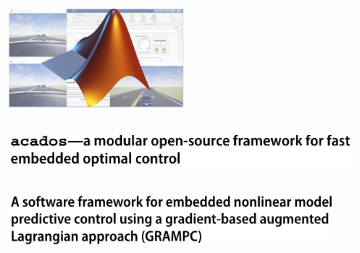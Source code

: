 \documentclass[
  letterpaper,
  DIV=11,
  numbers=noendperiod,
  oneside]{scrartcl}
\begin{document}
\begin{figure}
\begin{minipage}{0.33\linewidth}
\begin{figure}[H]

{\centering \includegraphics[width=\textwidth,height=1.04167in]{figs/package_mathworks.png}

}


\end{figure}%

\end{minipage}%
\newline
\begin{minipage}{0.50\linewidth}

\begin{figure}[H]

{\centering \includegraphics[width=\textwidth,height=0.52083in]{figs/package_acados.png}

}


\end{figure}%

\end{minipage}%
%
\begin{minipage}{0.50\linewidth}

\begin{figure}[H]

{\centering \includegraphics[width=\textwidth,height=0.52083in]{figs/package_grampc.png}

}


\end{figure}%

\end{minipage}%
\newline
\begin{minipage}{0.50\linewidth}


\end{minipage}
\end{figure}
\end{document}
